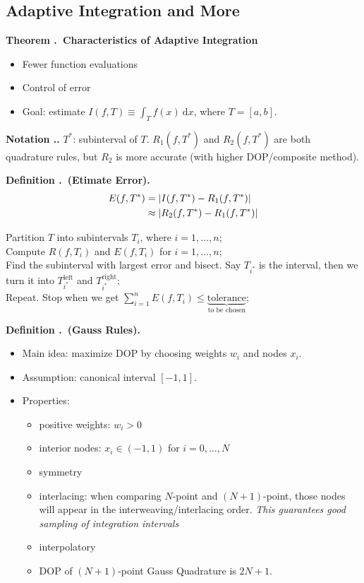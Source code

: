 \documentclass[12pt, a4paper]{article}
\newcounter{index}[subsection]
\newenvironment*{df}[1]{\par\noindent\textbf{Definition \thesubsection.\stepcounter{index}\theindex\ (#1).}}{\par}
\newenvironment*{thm}[1]{\begin{tcolorbox}\par\noindent\textbf{Theorem \thesubsection.\stepcounter{index}\theindex\ #1} \par}{\par\end{tcolorbox}}
\newenvironment*{nota}{\par\noindent\textbf{Notation \thesubsection.\stepcounter{index}\theindex.}}{\par}
\def\d{{\mathrm{d}}}
\def\dsst{\displaystyle}
\def\DOP{\mathrm{DOP}}
\begin{document}
\subsection{Adaptive Integration and More}
\begin{thm}{Characteristics of Adaptive Integration}
	\begin{itemize}
		\item Fewer function evaluations
		\item Control of error
		\item Goal: estimate $\dsst I(f,T)\equiv\int_Tf(x)\ \d{x}$, where $T=[a,b]$.
	\end{itemize}	
\end{thm}
\begin{nota}
	$T^*$: subinterval of $T$. $R_1(f,T^*)$ and $R_2(f,T^*)$ are both quadrature rules, but $R_2$ is more accurate (with higher $\DOP$/composite method). 
\end{nota}
\begin{df}{Etimate Error}
	\begin{align*}E(f,T^*)&=\qty|I(f,T^*)-R_1(f,T^*)|\\&\approx\qty|R_2(f,T^*)-R_1(f,T^*)|\end{align*}
\end{df}
\begin{algorithm}\caption{Adaptive Integration}
	Partition $T$ into subintervals $T_i$, where $i=1,\dots,n$;\\
	Compute	$R(f,T_i)$ and $E(f,T_i)$ for $i=1,\dots,n$;\\
	Find the subinterval with largest error and bisect. Say $T_{i^*}$ is the interval, then we turn it into $T_{i^*}^\text{left}$ and $T_{i^*}^\text{right}$;\\
	Repeat. Stop when we get $\dsst\sum_{i=1}^nE(f,T_i)\leq\underbrace{\text{tolerance}}_\text{to be chosen}$;
\end{algorithm}
\begin{df}{Gauss Rules}
	\begin{itemize}
		\item Main idea: maximize $\DOP$ by choosing weights $w_i$ and nodes $x_i$.
		\item Assumption: canonical interval $[-1,1]$.
		\item Properties:
		\begin{itemize}
			\item positive weights: $w_i>0$
			\item interior nodes: $x_i\in(-1,1)$ for $i=0,\dots,N$
			\item symmetry
			\item interlacing: when comparing $N$-point and $(N+1)$-point, those nodes will appear in the interweaving/interlacing order. \textit{This guarantees good sampling of integration intervals}
			\item interpolatory
			\item $\DOP$ of $(N+1)$-point Gauss Quadrature is $2N+1$.
		\end{itemize}
	\end{itemize}
\end{df}
\end{document}
